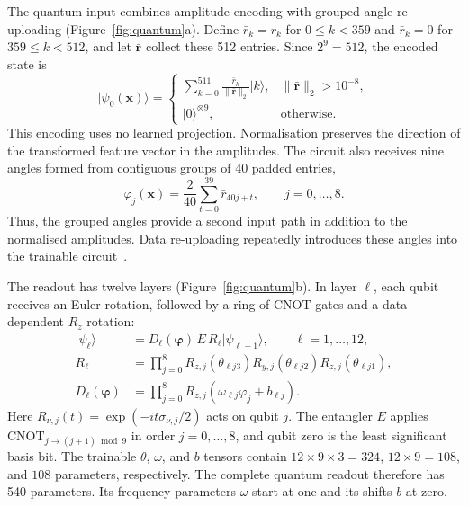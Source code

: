\documentclass[aps,a4paper,onecolumn,11pt,unpublished]{quantumarticle}
\begin{document}
The quantum input combines amplitude encoding with grouped angle re-uploading (Figure~\ref{fig:quantum}a). Define $\bar r_k=r_k$ for $0\leq k<359$ and $\bar r_k=0$ for $359\leq k<512$, and let $\bar{\mathbf r}$ collect these 512 entries. Since $2^9=512$, the encoded state is
\begin{equation}
|\psi_0(\mathbf{x})\rangle=
\begin{cases}
\displaystyle\sum_{k=0}^{511}\frac{\bar r_k}{\|\bar{\mathbf r}\|_2}|k\rangle,
&\|\bar{\mathbf r}\|_2>10^{-8},\\
|0\rangle^{\otimes9},&\text{otherwise}.
\end{cases}
\label{eq:amplitude}
\end{equation}
This encoding uses no learned projection. Normalisation preserves the direction of the transformed feature vector in the amplitudes. The circuit also receives nine angles formed from contiguous groups of 40 padded entries,
\begin{equation}
\varphi_j(\mathbf{x})=\frac{2}{40}\sum_{t=0}^{39}\bar r_{40j+t},
\qquad j=0,\ldots,8.
\label{eq:angles}
\end{equation}
Thus, the grouped angles provide a second input path in addition to the normalised amplitudes. Data re-uploading repeatedly introduces these angles into the trainable circuit~\cite{reuploading}.

The readout has twelve layers (Figure~\ref{fig:quantum}b). In layer $\ell$, each qubit receives an Euler rotation, followed by a ring of CNOT gates and a data-dependent $R_z$ rotation:
\begin{align}
|\psi_\ell\rangle&=D_\ell(\boldsymbol\varphi)\,E\,R_\ell|\psi_{\ell-1}\rangle,
\qquad \ell=1,\ldots,12,\label{eq:circuit}\\
R_\ell&=\prod_{j=0}^{8}R_{z,j}(\theta_{\ell j3})
 R_{y,j}(\theta_{\ell j2})R_{z,j}(\theta_{\ell j1}),\nonumber\\
D_\ell(\boldsymbol\varphi)&=\prod_{j=0}^{8}
 R_{z,j}(\omega_{\ell j}\varphi_j+b_{\ell j}).\nonumber
\end{align}
Here $R_{\nu,j}(t)=\exp(-it\sigma_{\nu,j}/2)$ acts on qubit $j$. The entangler $E$ applies $\mathrm{CNOT}_{j\to(j+1)\bmod9}$ in order $j=0,\ldots,8$, and qubit zero is the least significant basis bit. The trainable $\theta$, $\omega$, and $b$ tensors contain $12\times9\times3=324$, $12\times9=108$, and $108$ parameters, respectively. The complete quantum readout therefore has 540 parameters. Its frequency parameters $\omega$ start at one and its shifts $b$ at zero.
\end{document}
